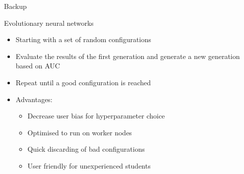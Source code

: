 \begin{frame}[plain,c]

\begin{center}
\Huge Backup
\end{center}

\end{frame}

\begin{frame}{Evolutionary neural networks}
    \begin{itemize}
        \item Starting with a set of random configurations
        \vspace{0.2cm}
        \item Evaluate the results of the first generation and generate a new generation based on AUC 
        \vspace{0.2cm}
        \item Repeat until a good configuration is reached
        \vspace{0.2cm}
        \item Advantages:
            \begin{itemize}
                \item Decrease user bias for hyperparameter choice
                \item Optimised to run on worker nodes
                \item Quick discarding of bad configurations
                \item User friendly for unexperienced students
            \end{itemize}
    \end{itemize}
\end{frame}


